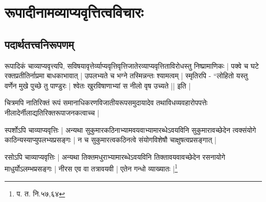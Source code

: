 \chapter{रूपादीनामव्याप्यवृत्तित्वविचारः}

\section{पदार्थतत्त्वनिरूपणम्} रूपादिकं चाव्याप्यवृत्त्यपि, सविषयावृत्तेर्व्याप्यवृत्तिवृत्तिजातेरव्याप्यवृत्तिताविरोधस्तु निष्प्रामाणिकः | पक्वे च घटे रक्तप्रतीतिर्नाप्रमा बाधकाभावात् | उपलभ्यते च भग्ने तस्मिन्नन्तः श्यामत्वम् | स्मृतिरपि - “लोहितो यस्तु वर्णेन मुखे पुच्छे तु पाण्डुरः | श्वेतः खुरविषाणाभ्यां स नीलो वृष उच्यते || इति |

चित्रमपि नातिरिक्तं रूपं समानाधिकरणविजातीयरूपसमुदायादेव तथाविधव्यवहारोपपत्तेः नीलादेर्नीलाद्यतिरिक्तरूपाजनकत्वाच्च |

स्पर्शोऽपि चाव्याप्यवृत्तिः | अन्यथा सुकुमारकठिनाभ्यामवयवाभ्यामारब्धेऽवयविनि सुकुमारावच्छेदेन त्वक्संयोगे काठिन्यस्याप्युपलभ्यप्रसङ्गः | न च सुकुमारत्वकठिनत्वे संयोगविशेषौ चाक्षुषत्वप्रसङ्गात् |

रसोऽपि चाव्याप्यवृत्तिः | अन्यथा तिक्तमधुराभ्यामारब्धेऽवयविनि तिक्तावयवावच्छेदेन रसनायोगे माधुर्योऽलम्भप्रसङ्गः | नीरस एव वा तत्रावयवी | एतेन गन्धो व्याख्यातः |\footnote{प. त. नि.५७,६४}
